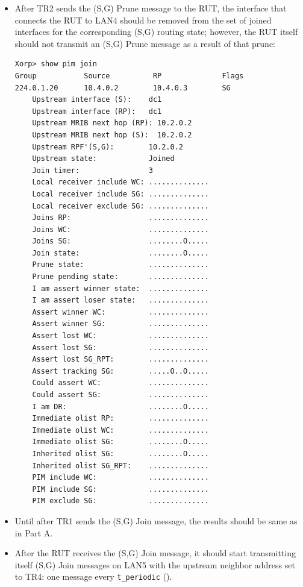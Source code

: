 \documentclass[11pt]{report}
\begin{document}
\begin{itemize}
  \item After TR2 sends the (S,G) Prune message to the RUT, the interface
  that connects the RUT to LAN4 should be removed from the set of joined
  interfaces for the corresponding (S,G) routing state; however, the RUT
  itself should not transmit an (S,G) Prune message as a result of that
  prune:

\begin{verbatim}
Xorp> show pim join 
Group           Source          RP              Flags
224.0.1.20      10.4.0.2        10.4.0.3        SG   
    Upstream interface (S):    dc1
    Upstream interface (RP):   dc1
    Upstream MRIB next hop (RP): 10.2.0.2
    Upstream MRIB next hop (S):  10.2.0.2
    Upstream RPF'(S,G):        10.2.0.2
    Upstream state:            Joined 
    Join timer:                3
    Local receiver include WC: ..............
    Local receiver include SG: ..............
    Local receiver exclude SG: ..............
    Joins RP:                  ..............
    Joins WC:                  ..............
    Joins SG:                  ........O.....
    Join state:                ........O.....
    Prune state:               ..............
    Prune pending state:       ..............
    I am assert winner state:  ..............
    I am assert loser state:   ..............
    Assert winner WC:          ..............
    Assert winner SG:          ..............
    Assert lost WC:            ..............
    Assert lost SG:            ..............
    Assert lost SG_RPT:        ..............
    Assert tracking SG:        .....O..O.....
    Could assert WC:           ..............
    Could assert SG:           ..............
    I am DR:                   ........O.....
    Immediate olist RP:        ..............
    Immediate olist WC:        ..............
    Immediate olist SG:        ........O.....
    Inherited olist SG:        ........O.....
    Inherited olist SG_RPT:    ..............
    PIM include WC:            ..............
    PIM include SG:            ..............
    PIM exclude SG:            ..............
\end{verbatim}

\end{itemize}


\begin{itemize}

  \item Until after TR1 sends the (S,G) Join message, the results should be
  same as in Part A.

  \item After the RUT receives the (S,G) Join message, it should start
  transmitting itself (S,G) Join messages on LAN5 with the upstream
  neighbor address set to TR4: one message every \verb=t_periodic=
  ({\PimsmTPeriodic}).

\end{itemize}
\end{document}
